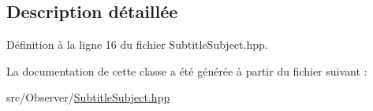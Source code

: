 \subsection{Description détaillée}


Définition à la ligne 16 du fichier Subtitle\+Subject.\+hpp.



La documentation de cette classe a été générée à partir du fichier suivant \+:\begin{DoxyCompactItemize}
\item 
src/\+Observer/\hyperlink{SubtitleSubject_8hpp}{Subtitle\+Subject.\+hpp}\end{DoxyCompactItemize}
